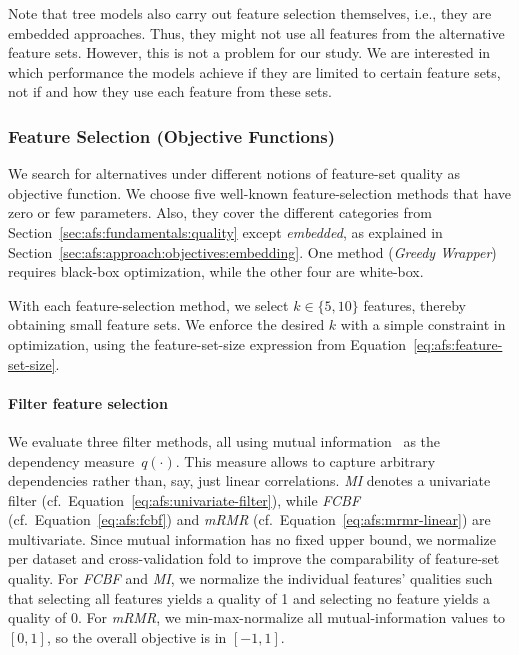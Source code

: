 \documentclass{article}
\theoremstyle{definition}
\begin{document}
Note that tree models also carry out feature selection themselves, i.e., they are embedded approaches.
Thus, they might not use all features from the alternative feature sets.
However, this is not a problem for our study.
We are interested in which performance the models achieve if they are limited to certain feature sets, not if and how they use each feature from these sets.

\subsubsection{Feature Selection (Objective Functions)}
\label{sec:afs:experimental-design:approaches:feature-selection}

We search for alternatives under different notions of feature-set quality as objective function.
We choose five well-known feature-selection methods that have zero or few parameters.
Also, they cover the different categories from Section~\ref{sec:afs:fundamentals:quality} except \emph{embedded}, as explained in Section~\ref{sec:afs:approach:objectives:embedding}.
One method (\emph{Greedy Wrapper}) requires black-box optimization, while the other four are white-box.

With each feature-selection method, we select $k \in \{5,10\}$ features, thereby obtaining small feature sets.
We enforce the desired $k$ with a simple constraint in optimization, using the feature-set-size expression from Equation~\ref{eq:afs:feature-set-size}.

\paragraph{Filter feature selection}

We evaluate three filter methods, all using mutual information~\cite{kraskov2004estimating} as the dependency measure~$q(\cdot)$.
This measure allows to capture arbitrary dependencies rather than, say, just linear correlations.
\emph{MI} denotes a univariate filter (cf.~Equation~\ref{eq:afs:univariate-filter}), while \emph{FCBF} (cf.~Equation~\ref{eq:afs:fcbf}) and \emph{mRMR} (cf.~Equation~\ref{eq:afs:mrmr-linear}) are multivariate.
Since mutual information has no fixed upper bound, we normalize per dataset and cross-validation fold to improve the comparability of feature-set quality.
For \emph{FCBF} and \emph{MI}, we normalize the individual features' qualities such that selecting all features yields a quality of 1 and selecting no feature yields a quality of 0.
For \emph{mRMR}, we min-max-normalize all mutual-information values to $[0,1]$, so the overall objective is in $[-1,1]$.
\end{document}
